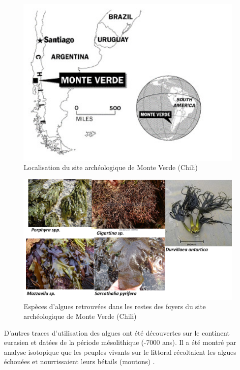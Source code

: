 \documentclass[
]{book}
\begin{document}
\begin{figure}

{\centering \includegraphics[width=5.15in]{images/Monte_verde} 

}

\caption{Localisation du site archéologique de Monte Verde (Chili)}\label{fig:monteverde}
\end{figure}

\begin{figure}

{\centering \includegraphics[width=14.29in]{images/Monte_verde_algue} 

}

\caption{Espèces d'algues retrouvées dans les restes des foyers du site archéologique de Monte Verde (Chili)}\label{fig:monteverdealgue}
\end{figure}

D'autres traces d'utilisation des algues ont été découvertes sur le continent eurasien et datées de la période mésolithique (-7000 ans). Il a été montré par analyse isotopique que les peuples vivants sur le littoral récoltaient les algues échouées et nourrissaient leurs bétails (moutons) \citep{balasse2005}.
\end{document}
